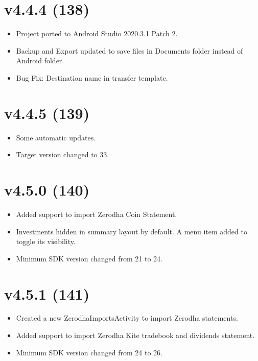 \documentclass{article}
\begin{document}
    \section{v4.4.4 (138)}\label{sec:138}
    \begin{itemize}
        \item Project ported to Android Studio 2020.3.1 Patch 2.
        \item Backup and Export updated to save files in Documents folder instead of Android folder.
        \item Bug Fix: Destination name in transfer template.
    \end{itemize}


    \section{v4.4.5 (139)}\label{sec:139}
    \begin{itemize}
        \item Some automatic updates.
        \item Target version changed to 33.
    \end{itemize}


    \section{v4.5.0 (140)}\label{sec:140}
    \begin{itemize}
        \item Added support to import Zerodha Coin Statement.
        \item Investments hidden in summary layout by default.
        A menu item added to toggle its visibility.
        \item Minimum SDK version changed from 21 to 24.
    \end{itemize}


    \section{v4.5.1 (141)}\label{sec:141}
    \begin{itemize}
        \item Created a new ZerodhaImportsActivity to import Zerodha statements.
        \item Added support to import Zerodha Kite tradebook and dividends statement.
        \item Minimum SDK version changed from 24 to 26.
    \end{itemize}
\end{document}
